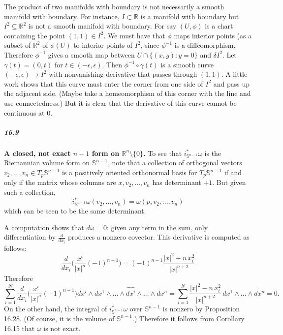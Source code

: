 \documentclass[10pt,letter]{article}
\begin{document}
The product of two manifolds with boundary is not necessarily a smooth manifold with boundary. For instance, $I \subset \mathbb{R}$ is a manifold with boundary but $I^2 \subseteq \mathbb{R}^2$ is not a smooth manifold with boundary. For say $(U,\phi)$ is a chart containing the point $(1,1) \in I^2$. We must have that $\phi$ maps interior points (as a subset of $\mathbb{R}^2$ of $\phi(U)$ to interior points of $I^2$, since $\phi^{-1}$ is a diffeomorphism. Therefore $\phi^{-1}$ gives a smooth map between $U \cap \lbrace (x,y): y = 0 \rbrace$ and $\delta I^2$. Let $\gamma(t) = (0,t)$ for $t \in (-\epsilon,\epsilon)$. Then $\phi^{-1} \circ \gamma(t)$ is a smooth curve $(-\epsilon,\epsilon) \rightarrow I^2$ with nonvanishing derivative that passes through $(1,1)$. A little work shows that this curve must enter the corner from one side of $I^2$ and pass up the adjacent side. (Maybe take a homeomorphism of this corner with the line and use connectedness.) But it is clear that the derivative of this curve cannot be continuous at $0$. 

\subparagraph*{16.9} {\bf A closed, not exact $n-1$ form on $\mathbb{R}^n\setminus \lbrace 0 \rbrace$.} 
To see that $i^{\ast}_{\mathbb{S}^{n-1}}\omega$ is the Riemannian volume form on $\mathbb{S}^{n-1}$, note that a collection of orthogonal vectors $v_2,...,v_{n} \in T_p\mathbb{S}^{n-1}$ is a positively oriented orthonormal basis for $T_p\mathbb{S}^{n-1}$ if and only if the matrix whose columns are $x,v_2,...,v_n$ has determinant $+1$.  But given such a collection, \[ i^{\ast}_{\mathbb{S}^{n-1}}\omega(v_2,...,v_n) =  \omega(p,v_2,...,v_n) \] which can be seen to be the same determinant.

A computation shows that $d\omega = 0$: given any term in the sum, only differentiation by $\frac{d}{dx_i}$ produces a nonzero covector. This derivative is computed as follows: \[ \frac{d}{dx_i} \bigg( \frac{x^i}{\vert x \vert^n}(-1)^{n-1}  \bigg) = (-1)^{n-1}  \frac{\vert x \vert^2 - n \, x_i^2}{\vert x \vert^{n+2}} \] 
Therefore
\[ \sum_{i=1}^N \frac{d}{dx_i}\bigg( \frac{x^i}{\vert x \vert^n}(-1)^{n-1}  \bigg) dx^i \wedge dx^1 \wedge ... \wedge \hat{dx^i} \wedge ... \wedge dx^n  = \sum_{i=1}^N  \frac{\vert x \vert^2 - n \, x_i^2}{\vert x \vert^{n+2}} \, dx^1 \wedge ... \wedge dx^n = 0.  \]
On the other hand, the integral of $i^{\ast}_{\mathbb{S}^{n-1}}\omega$ over $\mathbb{S}^{n-1}$ is nonzero by Proposition 16.28. (Of course, it is the volume of $\mathbb{S}^{n-1}$.) Therefore it follows from Corollary 16.15 that $\omega$ is not exact. 
\end{document}
